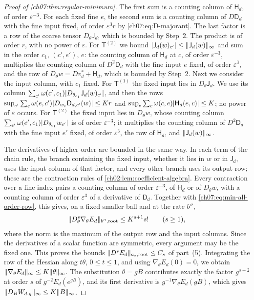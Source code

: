 \begin{proof}[Proof of \cref{ch07:thm:regular-minimum}]
The first sum is a counting column of $\mathsf H_d$, of order $\varepsilon^{-3}$. For each fixed fine $e$, the second sum is a counting column of $D\mathsf D_d$ with the fine input fixed, of order $\varepsilon^3r$ by \eqref{ch07:eq:D-majorant}. The last factor is a row of the coarse tensor $D_\theta\mathsf J_d$, which is bounded by Step~2. The product is of order $r$, with no power of $\varepsilon$. For $\mathsf T^{(2)}$ we bound $\lvert \mathsf J_d(w)_{c'}\rvert\le\lVert \mathsf J_d(w)\rVert_\infty$ and sum in the order $c_1$, $(c',e')$, $e$: the counting column of $\mathsf H_d$ at $c$, of order $\varepsilon^{-3}$, multiplies the counting column of $D^2\mathsf D_d$ with the fine input $e$ fixed, of order $\varepsilon^3$, and the row of $D_\theta w=Dv_d^*+\mathsf H_d$, which is bounded by Step~2. Next we consider the input column, with $c_1$ fixed. For $\mathsf T^{(1)}$ the fixed input lies in $D_\theta\mathsf J_d$. We use its column $\sum_{c'}\omega(c',c_1)\lvert D_{\theta_{c_1}}\mathsf J_d(w)_{c'}\rvert$, and then the rows $\sup_{c'}\sum_e\omega(e,c')\lvert D_{w_e}\mathsf D_{d,c'}(w)\rvert\le Kr$ and $\sup_e\sum_c\omega(c,e)\lvert \mathsf H_d(e,c)\rvert\le K$; no power of $\varepsilon$ occurs. For $\mathsf T^{(2)}$ the fixed input lies in $D_\theta w$, whose counting column $\sum_{e'}\omega(e',c_1)\lvert D_{\theta_{c_1}}w_{e'}\rvert$ is of order $\varepsilon^{-3}$; it multiplies the counting column of $D^2\mathsf D_d$ with the fine input $e'$ fixed, of order $\varepsilon^3$, the row of $\mathsf H_d$, and $\lVert \mathsf J_d(w)\rVert_\infty$.

The derivatives of higher order are bounded in the same way. In each term of the chain rule, the branch containing the fixed input, whether it lies in $w$ or in $\mathsf J_d$, uses the input column of that factor, and every other branch uses its output row; these are the contraction rules of \cref{ch02:lem:coefficient-algebra}. Every contraction over a fine index pairs a counting column of order $\varepsilon^{-3}$, of $\mathsf H_d$ or of $D_\theta w$, with a counting column of order $\varepsilon^3$ of a derivative of $\mathsf D_d$. Together with \eqref{ch07:eq:min-all-order-row}, this gives, on a fixed smaller ball and at the rate $b''$,
\begin{equation}\label{ch07:eq:action-majorant}
 \lVert D_\theta^s\nabla_\theta E_d\rVert_{b'',\mathrm{root}}\le K^{s+1}s!\qquad(s\ge1),
\end{equation}
where the norm is the maximum of the output row and the input columns. Since the derivatives of a scalar function are symmetric, every argument may be the fixed one. This proves the bounds $\lVert D^sE_d\rVert_{a_s,\mathrm{root}}\le C_s$ of part~(5). Integrating the row of the Hessian along $t\theta$, $0\le t\le1$, and using $\nabla_\theta E_d(0)=0$, we obtain $\lVert \nabla_\theta E_d\rVert_\infty\le K\lVert \theta\rVert_\infty$. The substitution $\theta=gB$ contributes exactly the factor $g^{s-2}$ at order $s$ of $g^{-2}E_d(e^{gB})$, and its first derivative is $g^{-1}\nabla_\theta E_d(gB)$, which gives $\lVert D_BW_{d,g}\rVert_\infty\le K\lVert B\rVert_\infty$.


\end{proof}
